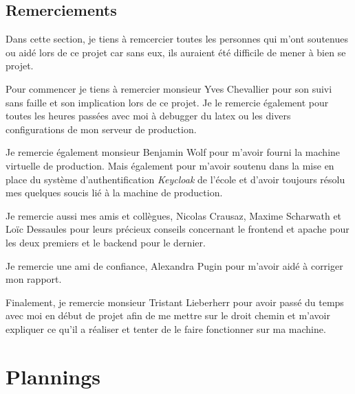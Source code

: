 \documentclass[
    iai, %
    il, %
]{heig-tb}
\begin{document}
\section{Remerciements}
Dans cette section, je tiens à remcercier toutes les personnes qui m'ont soutenues ou aidé lors de ce projet car sans eux, ils auraient été difficile de mener à bien se projet.

Pour commencer je tiens à remercier monsieur Yves Chevallier pour son suivi sans faille et son implication lors de ce projet. Je le remercie également pour toutes les heures passées avec moi à debugger du \Gls{latex} ou les divers configurations de mon serveur de production.

Je remercie également monsieur Benjamin Wolf pour m'avoir fourni la machine virtuelle de production. Mais également pour m'avoir soutenu dans la mise en place du système d'authentification \emph{Keycloak} de l'école et d'avoir toujours résolu mes quelques soucis lié à la machine de production.

Je remercie aussi mes amis et collègues, Nicolas Crausaz, Maxime Scharwath et Loïc Dessaules pour leurs précieux conseils concernant le \Gls{frontend} et \Gls{apache} pour les deux premiers et le \Gls{backend} pour le dernier.

Je remercie une ami de confiance, Alexandra Pugin pour m'avoir aidé à corriger mon rapport.

Finalement, je remercie monsieur Tristant Lieberherr pour avoir passé du temps avec moi en début de projet afin de me mettre sur le droit chemin et m'avoir expliquer ce qu'il a réaliser et tenter de le faire fonctionner sur ma machine.

\vfil
\hspace{8cm}\makeatletter\@author\makeatother\par
\hspace{8cm}\begin{minipage}{5cm}
    \printsignature
\end{minipage}
\clearpage

\appendix
\appendixpage
\addappheadtotoc

\chapter{Plannings}

\begin{landscape}
    
\end{landscape}
\end{document}
